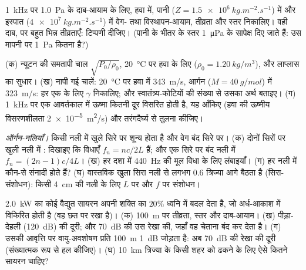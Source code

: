\begin{exercise}[$\star\star$]\label{exo:b2:sound-waves:6}
\qty{1}{kHz} पर \qty{1.0}{Pa} के दाब-आयाम के लिए, हवा में, पानी
($Z = \qty{1.5e6}{kg.m^{-2}.s^{-1}}$) में और इस्पात
($\qty{4e7}{kg.m^{-2}.s^{-1}}$) में वेग- तथा विस्थापन-आयाम, तीव्रता और स्तर निकालिए।
वही दाब, पर बहुत भिन्न तीव्रताएँ:
टिप्पणी दीजिए। (पानी के भीतर के स्तर \qty{1}{\micro Pa} के सापेक्ष दिए जाते हैं: उस मापनी पर
\qty{1}{Pa} कितना है?)
\end{exercise}

\begin{exercise}[$\star\star$]\label{exo:b2:sound-waves:7}
(क) न्यूटन की समतापी चाल $\sqrt{P_0/\rho_0}$, \qty{20}{\degreeCelsius} पर हवा के
लिए ($\rho_0 = \qty{1.20}{kg/m^3}$), और लाप्लास का सुधार।
(ख) नापी गई चालें: \qty{20}{\degreeCelsius} पर हवा में \qty{343}{m/s}, आर्गन ($M = \qty{40}{g/mol}$)
में \qty{323}{m/s}: हर एक के लिए $\gamma$ निकालिए; और
स्वातंत्र्य-कोटियों की संख्या से उसका अर्थ बताइए। (ग) \qty{1}{kHz} पर एक आवर्तकाल में
ऊष्मा कितनी दूर विसरित होती है, यह आँकिए (हवा की ऊष्मीय विसरणशीलता
\qty{2e-5}{m^2/s}) और तरंगदैर्घ्य से तुलना कीजिए।
\end{exercise}

\begin{exercise}[$\star\star$]\label{exo:b2:sound-waves:8}
\emph{ऑर्गन-नलियाँ।} किसी नली में  खुले सिरे पर शून्य होता है
और वेग बंद सिरे पर। (क) दोनों सिरों पर खुली नली में :
दिखाइए कि विधाएँ $f_n = nc/2L$ हैं; और एक सिरे पर बंद नली में
$f_n = (2n - 1)c/4L$। (ख) हर दशा में \qty{440}{Hz} की मूल विधा के लिए
लंबाइयाँ। (ग) हर नली में कौन-से संनादी होते हैं? (घ) वास्तविक
खुला सिरा नली से लगभग $0.6$ त्रिज्या आगे बैठता है (सिरा-संशोधन): किसी
\qty{4}{cm} की नली के लिए $L$ पर और $f$ पर संशोधन।
\end{exercise}

\begin{exercise}[$\star\star$]\label{exo:b2:sound-waves:9}
\qty{2.0}{kW} का कोई वैद्युत सायरन अपनी शक्ति का $20\%$ ध्वनि में बदल देता है,
जो अर्ध-आकाश में विकिरित होती है (वह छत पर रखा है)। (क) \qty{100}{m} पर तीव्रता, स्तर
और दाब-आयाम। (ख) पीड़ा-देहली (\qty{120}{dB}) की दूरी;
और \qty{70}{dB} की उस रेखा की, जहाँ वह चेताना बंद कर देता है।
(ग) उसकी आवृत्ति पर वायु-अवशोषण प्रति \qty{100}{m} \qty{1}{dB} जोड़ता है:
अब \qty{70}{dB} की रेखा की दूरी (संख्यात्मक रूप से हल कीजिए)। (घ) \qty{10}{km}
त्रिज्या के किसी शहर को ढकने के लिए ऐसे कितने सायरन चाहिए?
\end{exercise}

